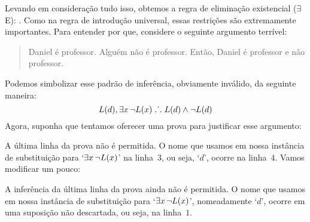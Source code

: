 Levando em considera\c c\~ao tudo isso, obtemos a regra de elimina\c c\~ao existencial ($\exists$E):
.
Como na regra de introdu\c c\~ao universal, essas restri\c c\~oes s\~ao extremamente importantes. Para entender por que, considere o seguinte argumento terr\'ivel:
	\begin{quote}
		Daniel \'e professor. Algu\'em n\~ao \'e professor. Ent\~ao, Daniel \'e professor e n\~ao professor.
	\end{quote}
Podemos simbolizar esse padr\~ao de infer\^encia, obviamente inv\'alido, da seguinte maneira:
$$\mathord{L}(d), \exists x\, \neg\mathord{L}(x) \mathrel{\ldotp\dot{}\,\ldotp} \mathord{L}(d) \wedge \neg \mathord{L}(d)$$
Agora, suponha que tentamos oferecer uma prova para justificar esse argumento:

\begin{fitchproof}
	\open	
	\close
\end{fitchproof}
A \'ultima linha da prova n\~ao \'e permitida. O nome que usamos em nossa inst\^ancia de substitui\c c\~ao para `$\exists x\, \neg \mathord{L}(x)$' na linha~$3$, ou seja,  `$d$', ocorre na linha~$4$. Vamos modificar um pouco:
\begin{fitchproof}
	\open	
	\close
\end{fitchproof}
A  infer\^encia da \'ultima linha da prova ainda n\~ao \'e permitida. O nome que usamos em nossa inst\^ancia de substitui\c c\~ao para `$\exists x\, \neg \mathord{L}(x)$', nomeadamente `$d$', ocorre em uma suposi\c c\~ao n\~ao descartada, ou seja, na linha~$1$.

